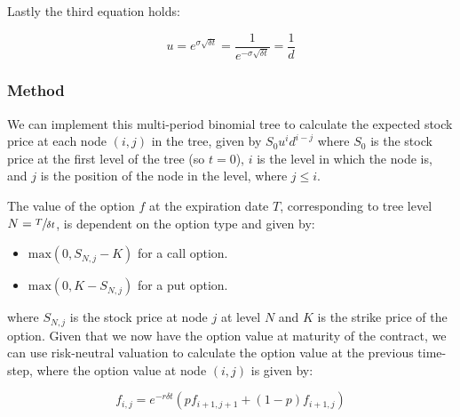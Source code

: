 \documentclass[11pt,a4paper]{article}
\begin{document}
Lastly the third equation holds:

\begin{equation}
u=e^{\sigma\sqrt{\delta t}}=\frac{1}{e^{-\sigma\sqrt{\delta t}}}=\frac{1}{d}
\end{equation}

\subsubsection{Method}
We can implement this multi-period binomial tree to calculate the expected stock price at each node $(i,j)$ in the tree, given by $S_{0}u^id^{i-j}$ where $S_{0}$ is the stock price at the first level of the tree (so $t = 0$), $i$ is the level in which the node is, and $j$ is the position of the node in the level, where $j \leq i$. 

%
%

The value of the option $f$ at the expiration date $T$, corresponding to tree level $N = \sfrac{T}{\delta t}$, is dependent on the option type and given by:

\begin{itemize}
\item 
  $\text{max}(0,S_{N,j} - K)$ for a call option.
\item
  $\text{max}(0,K - S_{N,j})$ for a put option.
\end{itemize}

where $S_{N,j}$ is the stock price at node $j$ at level $N$ and $K$ is the strike price of the option. Given that we now have the option value at maturity of the contract, we can use risk-neutral valuation to calculate the option value at the previous time-step, where the option value at node $(i,j)$ is given by:

\begin{equation}
  \label{eq:f}
  f_{i,j} = e^{-r \delta t}(p f_{i+1,j+1} + (1 - p) f_{i+1,j})
\end{equation}

%
%
\end{document}
